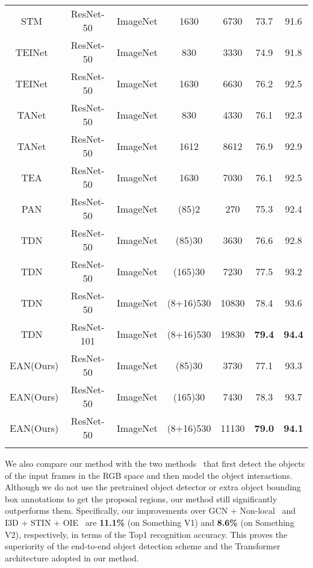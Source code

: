 \begin{table*}[!th]
{\begin{tabular}{ccccccc}
			STM~\cite{jiang2019stm}   & ResNet-50 & ImageNet & 1630 & 6730 & 73.7&91.6  \\ 
			
			TEINet~\cite{liu2020teinet}  & ResNet-50 & ImageNet & 830 & 3330 & 74.9&91.8 \\ 
			TEINet~\cite{liu2020teinet}  & ResNet-50 & ImageNet & 1630 & 6630 & 76.2&92.5 \\
			
			TANet~\cite{liu2020teinet}  & ResNet-50 & ImageNet & 830 & 4330 & 76.1&92.3 \\ 
			TANet~\cite{liu2020teinet}  & ResNet-50 & ImageNet & 1612 & 8612 & 76.9&92.9 \\
			TEA~\cite{li2020tea}  & ResNet-50 & ImageNet & 1630 & 7030 & 76.1&92.5 \\ 
			PAN~\cite{zhang2020pan}  & ResNet-50 & ImageNet &  (85)2 & 270 & 75.3&92.4 \\
			TDN~\cite{wang2020tdn}  & ResNet-50 & ImageNet & (85)30 & 3630 & 76.6&92.8 \\
			TDN~\cite{wang2020tdn}  & ResNet-50 & ImageNet & (165)30 & 7230 & 77.5&93.2 \\
			TDN~\cite{wang2020tdn}  & ResNet-50 & ImageNet & (8+16)530 & 10830 & 78.4&93.6 \\
			TDN~\cite{wang2020tdn}  & ResNet-101 & ImageNet & (8+16)530 & 19830 & \textbf{79.4}&\textbf{94.4} \\
			\hline 
			EAN(Ours) 	& ResNet-50 & ImageNet & (85)30 &  3730 & 77.1 &93.3 \\
			EAN(Ours)& ResNet-50 & ImageNet & (165)30 &  7430 & 78.3 &93.7 \\
			EAN(Ours)& ResNet-50 & ImageNet & (8+16)530 &  11130 & \textbf{79.0} &\textbf{94.1} \\
			\Xhline{2\arrayrulewidth}
		\end{tabular}
	}
	
	\label{tab_k400_sota}
\end{table*}


We also compare our method with the two methods~\cite{materzynska2020something}\cite{wang2018videos} that first detect the objects of the input frames in the RGB space and then model the object interactions.
Although we do not use the pretrained object detector or extra object bounding box annotations to get the proposal regions, our method still significantly outperforms them.
Specifically, our improvements over GCN + Non-local~\cite{wang2018videos} and I3D + STIN + OIE~\cite{materzynska2020something} are \textbf{11.1\%} (on Something V1) and \textbf{8.6\%} (on Something V2), respectively, in terms of the Top1 recognition accuracy.
This proves the superiority of the end-to-end object detection scheme and the Transformer architecture adopted in our method.


